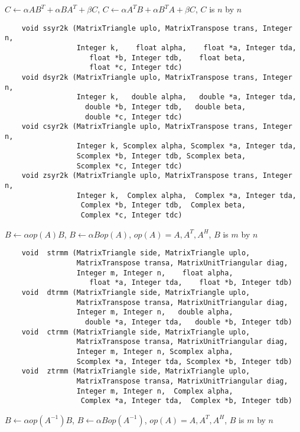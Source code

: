 \normalsize
$C \leftarrow \alpha A B^T + \alpha B A^T + \beta C$,
$C \leftarrow \alpha A^T B + \alpha B^T A + \beta C$,
$C$ is $n$ by $n$
\footnotesize
\begin{verbatim}
    void ssyr2k (MatrixTriangle uplo, MatrixTranspose trans, Integer n,
                 Integer k,    float alpha,    float *a, Integer tda,
                    float *b, Integer tdb,    float beta,
                    float *c, Integer tdc)
    void dsyr2k (MatrixTriangle uplo, MatrixTranspose trans, Integer n,
                 Integer k,   double alpha,   double *a, Integer tda,
                   double *b, Integer tdb,   double beta,
                   double *c, Integer tdc)
    void csyr2k (MatrixTriangle uplo, MatrixTranspose trans, Integer n,
                 Integer k, Scomplex alpha, Scomplex *a, Integer tda,
                 Scomplex *b, Integer tdb, Scomplex beta,
                 Scomplex *c, Integer tdc)
    void zsyr2k (MatrixTriangle uplo, MatrixTranspose trans, Integer n,
                 Integer k,  Complex alpha,  Complex *a, Integer tda,
                  Complex *b, Integer tdb,  Complex beta,
                  Complex *c, Integer tdc) 
\end{verbatim}
\normalsize
$B \leftarrow \alpha op(A)B$, $B \leftarrow \alpha B op(A)$,
$op(A) = A,A^T,A^H$, $B$ is $m$ by $n$
\footnotesize
\begin{verbatim}
    void  strmm (MatrixTriangle side, MatrixTriangle uplo,
                 MatrixTranspose transa, MatrixUnitTriangular diag,
                 Integer m, Integer n,    float alpha,
                    float *a, Integer tda,    float *b, Integer tdb)
    void  dtrmm (MatrixTriangle side, MatrixTriangle uplo,
                 MatrixTranspose transa, MatrixUnitTriangular diag,
                 Integer m, Integer n,   double alpha,
                   double *a, Integer tda,   double *b, Integer tdb)
    void  ctrmm (MatrixTriangle side, MatrixTriangle uplo,
                 MatrixTranspose transa, MatrixUnitTriangular diag,
                 Integer m, Integer n, Scomplex alpha,
                 Scomplex *a, Integer tda, Scomplex *b, Integer tdb)
    void  ztrmm (MatrixTriangle side, MatrixTriangle uplo,
                 MatrixTranspose transa, MatrixUnitTriangular diag,
                 Integer m, Integer n,  Complex alpha,
                  Complex *a, Integer tda,  Complex *b, Integer tdb)
\end{verbatim}
\normalsize
$B \leftarrow \alpha op(A^{-1}) B$,
$B \leftarrow \alpha B op(A^{-1})$,
$op(A) = A,A^T,A^H$,
$B$ is $m$ by $n$
